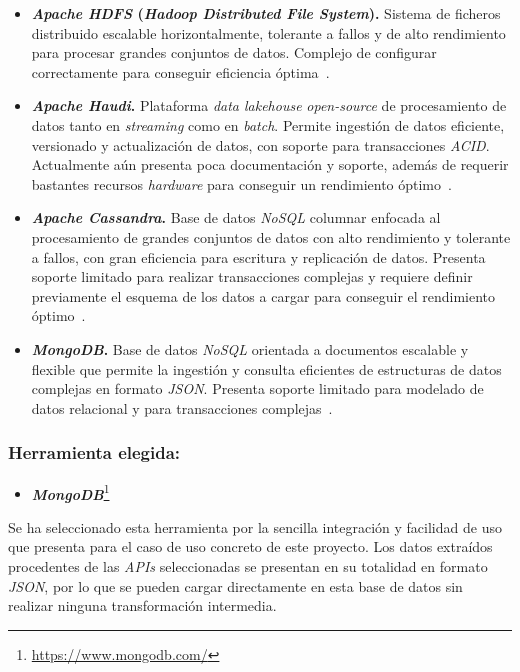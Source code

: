 \begin{itemize}
    \item \textbf{\textit{Apache HDFS} (\textit{Hadoop Distributed File System}).} Sistema de ficheros distribuido escalable horizontalmente, tolerante a fallos y de alto rendimiento para procesar grandes conjuntos de datos. Complejo de configurar correctamente para conseguir eficiencia óptima~\cite{hdfsArchitecture}.
    \item \textbf{\textit{Apache Haudi}.} Plataforma \textit{data lakehouse} \textit{open-source} de procesamiento de datos tanto en \textit{streaming} como en \textit{batch}. Permite ingestión de datos eficiente, versionado y actualización de datos, con soporte para transacciones \textit{ACID}. Actualmente aún presenta poca documentación y soporte, además de requerir bastantes recursos \textit{hardware} para conseguir un rendimiento óptimo~\cite{hudiOverview}.
    \item \textbf{\textit{Apache Cassandra}.} Base de datos \textit{NoSQL} columnar enfocada al procesamiento de grandes conjuntos de datos con alto rendimiento y tolerante a fallos, con gran eficiencia para escritura y replicación de datos. Presenta soporte limitado para realizar transacciones complejas y requiere definir previamente el esquema de los datos a cargar para conseguir el rendimiento óptimo~\cite{cassandraOverview}.
    \item \textbf{\textit{MongoDB}.} Base de datos \textit{NoSQL} orientada a documentos escalable y flexible que permite la ingestión y consulta eficientes de estructuras de datos complejas en formato \textit{JSON}. Presenta soporte limitado para modelado de datos relacional y para transacciones complejas~\cite{mongodbArchitecture}.
\end{itemize}

\subsubsection{Herramienta elegida:}

\begin{itemize}
    \item \textbf{\textit{MongoDB}}\footnote{\url{https://www.mongodb.com/}}
\end{itemize}

Se ha seleccionado esta herramienta por la sencilla integración y facilidad de uso que presenta para el caso de uso concreto de este proyecto. Los datos extraídos procedentes de las \textit{APIs} seleccionadas se presentan en su totalidad en formato \textit{JSON}, por lo que se pueden cargar directamente en esta base de datos sin realizar ninguna transformación intermedia. 